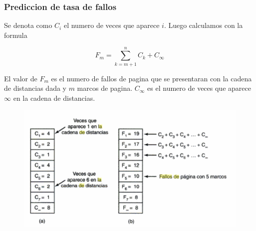 \documentclass{beamer}
\begin{document}
\begin{frame}
	\frametitle{Prediccion de tasa de fallos}
	\footnotesize
	Se denota como $C_{i}$ el numero de veces que aparece $i$. Luego calculamos con la formula 
	
	\begin{equation*}
	F_{m} = \sum_{k=m+1}^{n}C_k + C_\infty
	\end{equation*}
	
	El valor de $F_{m}$ es el numero de fallos de pagina que se presentaran con la cadena de distancias dada y $m$ marcos de pagina. $C_\infty$ es el numero de veces que aparece $\infty$ en la cadena de distancias.
	
	\begin{figure}[H]
		\centering
		\includegraphics[scale=0.4]{img/fallos.png}
	\end{figure}
\end{frame}
\end{document}
